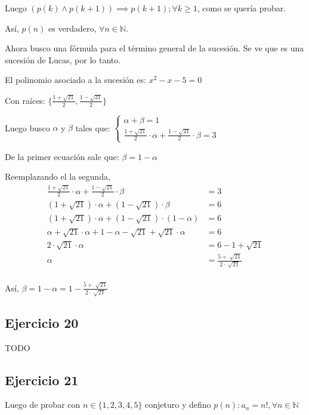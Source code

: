 Luego $(p(k) \wedge p(k+1)) \implies p(k+1); \forall k \geq 1$, como se quería probar.

Así, $p(n)$ es verdadero, $\forall n \in \mathbb{N}$.

Ahora busco una fórmula para el término general de la sucesión. Se ve que es una sucesión de Lucas, por lo tanto.

El polinomio asociado a la sucesión es: $ x^2 - x - 5= 0 $

Con raíces: $ \{ \frac{1+\sqrt{21}}{2}, \frac{1-\sqrt{21}}{2} \} $

Luego busco $ \alpha $ y $ \beta $ tales que:
$\begin{cases}
    \alpha + \beta = 1 \\
    \frac{1+\sqrt{21}}{2} \cdot \alpha + \frac{1-\sqrt{21}}{2} \cdot \beta = 3
\end{cases}$

De la primer ecuación sale que: $ \beta = 1- \alpha $

Reemplazando el la segunda,
\begin{align*}
    \frac{1+\sqrt{21}}{2} \cdot \alpha + \frac{1-\sqrt{21}}{2} \cdot \beta &= 3 \\
    (1+\sqrt{21}) \cdot \alpha + (1-\sqrt{21}) \cdot \beta &= 6 \\
    (1+\sqrt{21}) \cdot \alpha + (1-\sqrt{21}) \cdot (1- \alpha) &= 6 \\
    \alpha +\sqrt{21} \cdot \alpha + 1- \alpha-\sqrt{21} + \sqrt{21} \cdot \alpha &= 6 \\
    2 \cdot \sqrt{21} \cdot \alpha &= 6 - 1 + \sqrt{21} \\
    \alpha &= \frac{5+\sqrt[]{21}}{2\cdot \sqrt[]{21}} \\
\end{align*}

Así, $ \beta = 1 - \alpha = 1 - \frac{5+\sqrt[]{21}}{2\cdot \sqrt[]{21}} $

\subsection{Ejercicio 20}

TODO

\subsection{Ejercicio 21}

Luego de probar con $ n \in \{ 1,2,3,4,5 \} $ conjeturo y defino $ p(n): a_n = n!, \forall n \in \mathbb{N}$

